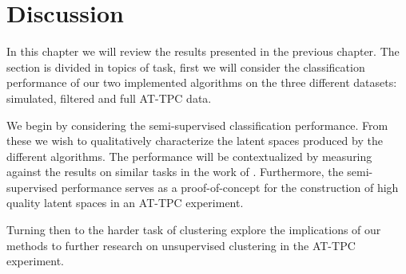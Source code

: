 \chapter{Discussion}
In this chapter we will review the results presented in the previous chapter. The section is divided in topics of task, first we will consider the classification performance of our two implemented algorithms on the three different datasets: simulated, filtered and full AT-TPC data. 

We begin by considering the semi-supervised classification performance. From these we wish to qualitatively characterize the latent spaces produced by the different algorithms. The performance will be contextualized by measuring against the results on similar tasks in the work of \citet{Kuchera2019}. Furthermore, the semi-supervised performance serves as a proof-of-concept for the construction of high quality latent spaces in an AT-TPC experiment.

Turning then to the harder task of clustering explore the implications of our methods to further research on unsupervised clustering in the AT-TPC experiment.